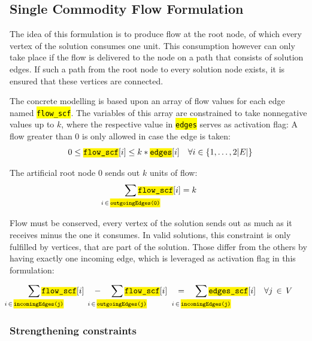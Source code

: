 \documentclass[,%
			paper=a4,%
			DIV14,
			liststotoc,
			bibtotoc,
			draft=false,%
			numbers=noendperiod
			]{scrartcl}
\newcommand{\ilc}[1]{\hl{\texttt{#1}}} %
\newcommand{\edge}{i}
\newcommand{\forallEdges}{\ensuremath{\forall \edge \in \{1, \dotsc, 2|E|\}}}
\begin{document}
\subsection{Single Commodity Flow Formulation}

The idea of this formulation is to produce flow at the root node, of which every vertex of the solution consumes one unit.
This consumption however can only take place if the flow is delivered to the node on a path that consists of solution edges.
If such a path from the root node to every solution node exists, it is ensured that these vertices are connected.

The concrete modelling is based upon an array of flow values for each edge named \ilc{flow\_scf}.
The variables of this array are constrained to take nonnegative values up to $k$, where the respective value in \ilc{edges} serves as activation flag: A flow greater than 0 is only allowed in case the edge is taken:
\begin{equation}\label{eq:scf1}
	0 \leq \ilc{flow\_scf}[\edge] \leq k * \ilc{edges}[\edge] \quad \forallEdges 
\end{equation}

The artificial root node $0$ sends out $k$ units of flow:\nolinebreak
\begin{equation}
	\sum_{\mathclap{i\,\in\,\ilc{outgoingEdges(0)}}} \ilc{flow\_scf}[i] = k
\end{equation}

Flow must be conserved, every vertex of the solution sends out as much as it receives minus the one it consumes. In valid solutions, this constraint is only fulfilled by vertices, that are part of the solution. Those differ from the others by having exactly one incoming edge, which is leveraged as activation flag in this formulation:

\begin{equation}
	\sum_{\mathclap{i\,\in\,\ilc{incomingEdges(j)}}} \ilc{flow\_scf}[i] \quad - \quad
	\sum_{\mathclap{i\,\in\,\ilc{outgoingEdges(j)}}} \ilc{flow\_scf}[i] \quad = \quad 
	\sum_{\mathclap{i\,\in\,\ilc{incomingEdges(j)}}} \ilc{edges\_scf}[i] 
	\quad \forall j\,\in\,V
\end{equation}


\subsubsection{Strengthening constraints}
\end{document}
